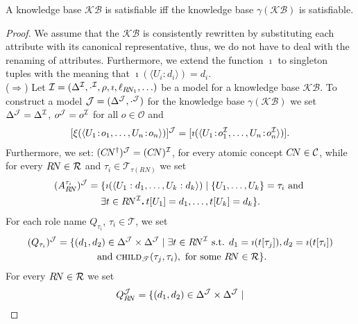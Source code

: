 \documentclass[envcountsame,draft]{llncs}
\newcommand{\KB}{\ensuremath{\mathcal{KB}}\xspace}
\newcommand{\per}{\mathpunct{\mbox{\bf .}}}
\newcommand{\chd}[2]{\ensuremath{\textsc{child}_{\mathscr{T}}(#1,#2)}\xspace}
\newcommand{\Ob}{\ensuremath{\mathcal{O}}\xspace}
\begin{document}
\begin{theorem}
	\label{th:sat} A \DLRpm knowledge base $\KB$ is satisfiable iff the \ALCQI knowledge base $\gamma(\KB)$ is satisfiable. 
\end{theorem}
%
\begin{proof}
  We assume that the \KB is consistently rewritten by substituting
  each attribute with its canonical representative, thus, we do not
  have to deal with the renaming of attributes. Furthermore, we extend
  the function $\imath$ to
  singleton tuples with the meaning that $\imath(\langle
  U_i:d_i\rangle)=d_i$.\\
%
  ($\Rightarrow$) Let
  $\mathcal{I} = (\Delta^\mathcal{I}, \cdot^\mathcal{I}, \rho, \imath,
  \ell_{R\!N_1},\ldots)$ be a model for a \DLRpm knowledge base
  $\KB$. To construct a model $\mathcal{J}=(\Delta^\mathcal{J},\cdot^\mathcal{J})$ for the
  \ALCQI knowledge base $\gamma(\KB)$ we set
  $\Delta^\mathcal{J} = \Delta^\mathcal{I}$, $o^\mathcal{J} = o^\mathcal{I}$ for all $o\in\Ob$ and
%
  \begin{align}
    \label{int:xi}    
    [\xi(\langle U_1\!:\!o_1,\ldots,U_n\!:\!o_n\rangle)]^\Jmc =
    [\imath(\langle
    U_1\!:\!o^\Imc_1,\ldots,U_n\!:\!o^\Imc_n\rangle)].
  \end{align}
%
  Furthermore, we set:
  $(C\!N^\dag)^\mathcal{J}=(C\!N)^\mathcal{I}$, for every atomic concept
  $C\!N\in\mathcal{C}$, while for every ${R\!N}\in\mathcal{R}$ and
  ${\tau_i\in\mathscr{T}_{\tau(R\!N)}}$ we set
  \begin{multline}\label{eq:R}
    (A_{R\!N}^{\tau_i})^\Jmc = \{\imath(\langle U_1:d_1,\ldots,U_k:d_k\rangle) \mid 
    \{U_1,\ldots,U_k\}=\tau_i \text{ and } \\ \exists t\in R\!N^\Imc\per t[U_1]=d_1,\ldots,t[U_k]=d_k\}.
  \end{multline}
%
  For each role name $Q_{\tau_i}$, $\tau_i\in\mathscr{T}$, we set
  \begin{multline}\label{eq:Q}
    (Q_{\tau_i})^\Jmc = \{(d_1,d_2)\in \Delta^\Jmc\times
    \Delta^\Jmc\mid \exists t\in {R\!N}^\Imc \text{ s.t. } d_1=\imath(t[{\tau_j}]), d_2=\imath(t[{\tau_i}])\\
    \text{ and } \chd{\tau_j}{\tau_i}, \text{ for some } {R\!N}\in\R\}.
  \end{multline}
%
  For every ${R\!N}\in\mathcal{R}$ we set
  \begin{multline}\label{eq:loc}
  Q_{R\!N}^\Jmc = \{(d_1,d_2)\in \Delta^\Jmc\times \Delta^\Jmc\mid

\end{multline}
\end{proof}
\end{document}

